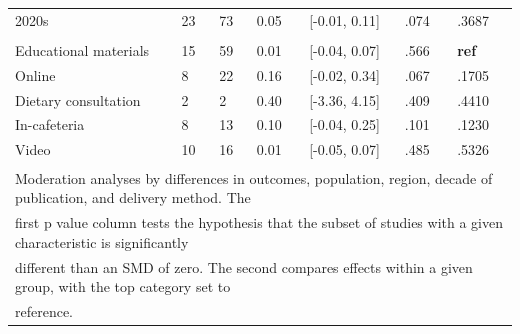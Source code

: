 \documentclass[sn-nature,referee,pdflatex]{sn-jnl}
\begin{document}
\begin{table}[!ht]
\begin{tabular}[t]{lllllll}
\hspace{1em}2020s & 23 & 73 & 0.05 & {}[-0.01, 0.11] & .074 & .3687\\
\addlinespace[0.3em]
\multicolumn{7}{l}{\textbf{Method of Delivery}}\\
\hspace{1em}Educational materials & 15 & 59 & 0.01 & {}[-0.04, 0.07] & .566 & \textbf{ref}\\
\hspace{1em}Online & 8 & 22 & 0.16 & {}[-0.02, 0.34] & .067 & .1705\\
\hspace{1em}Dietary consultation & 2 & 2 & 0.40 & {}[-3.36, 4.15] & .409 & .4410\\
\hspace{1em}In-cafeteria & 8 & 13 & 0.10 & {}[-0.04, 0.25] & .101 & .1230\\
\hspace{1em}Video & 10 & 16 & 0.01 & {}[-0.05, 0.07] & .485 & .5326\\
\bottomrule
\multicolumn{7}{l}{\textsuperscript{} Moderation analyses by differences in outcomes, population, region, decade of publication, and delivery method. The}\\
\multicolumn{7}{l}{first p value column tests the hypothesis that the subset of studies with a given characteristic is significantly}\\
\multicolumn{7}{l}{different than an SMD of zero. The second compares effects within a given group, with the top category set to}\\
\multicolumn{7}{l}{reference.}\\
\end{tabular}
\end{table}
\end{document}
